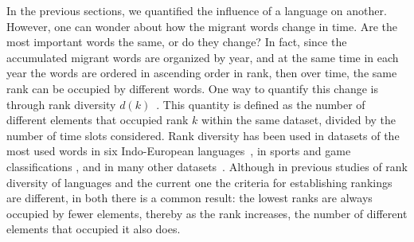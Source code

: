 \documentclass[10pt,letterpaper]{article} %
\begin{document}
In the previous sections, we quantified the influence of a language on another. However, 
one can wonder about how the migrant words change in time. Are the most important words
the same, or do they change? In fact, 
since the accumulated migrant words are organized by year, and at the same time
in each year the words are ordered in ascending order in rank, then over time,
the same rank can be occupied by different words. One way to quantify
this change is through rank diversity $d(k)$~\cite{iplosone}. This quantity is
defined as the number 
of different elements that occupied rank  $k$ within the same dataset, divided
by the number of time slots considered.
Rank diversity has been used in datasets of the most used words in six
Indo-European languages~\cite{iplosone,10.3389/fphy.2018.00045,Cocho2019}, in sports and game classifications \cite{Morales_epj}, 
and in many other datasets~\cite{Iniguez2022}. 
Although in previous studies of rank diversity of languages and the current one the criteria for establishing rankings are different, in both there
is a common result: the lowest ranks are always occupied by fewer
elements, thereby as the rank increases, the number of different elements that occupied it
also does.
\end{document}
